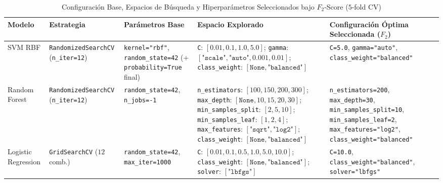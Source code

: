 \documentclass[conference]{IEEEtran}
\begin{document}
\begin{table}[t]
\centering
\scriptsize
\setlength{\tabcolsep}{4pt}
\caption{Configuración Base, Espacios de Búsqueda y Hiperparámetros Seleccionados bajo $F_2$-Score ($5$-fold CV)}
\label{tab:hyperparams_space}
\begin{tabular}{@{}lp{2.85cm}p{2.85cm}p{5.2cm}p{3.75cm}@{}}
\toprule
\textbf{Modelo} & \textbf{Estrategia} & \textbf{Parámetros Base} & \textbf{Espacio Explorado} & \textbf{Configuración Óptima Seleccionada ($F_2$)} \\
\midrule
SVM RBF & \texttt{RandomizedSearchCV} (\texttt{n\_iter=12}) & \texttt{kernel="rbf"}, \texttt{random\_state=42} (+ \texttt{probability=True} final) & \texttt{C}: $[0.01, 0.1, 1.0, 5.0]$; \texttt{gamma}: $[\texttt{"scale"}, \texttt{"auto"}, 0.001, 0.01]$; \texttt{class\_weight}: $[\texttt{None}, \texttt{"balanced"}]$ & \texttt{C=5.0}, \texttt{gamma="auto"}, \texttt{class\_weight="balanced"} \\
\midrule
Random Forest & \texttt{RandomizedSearchCV} (\texttt{n\_iter=12}) & \texttt{random\_state=42}, \texttt{n\_jobs=-1} & \texttt{n\_estimators}: $[100, 150, 200, 300]$; \texttt{max\_depth}: $[\texttt{None}, 10, 15, 20, 30]$; \texttt{min\_samples\_split}: $[2, 5, 10]$; \texttt{min\_samples\_leaf}: $[1, 2, 4]$; \texttt{max\_features}: $[\texttt{"sqrt"}, \texttt{"log2"}]$; \texttt{class\_weight}: $[\texttt{None}, \texttt{"balanced"}]$ & \texttt{n\_estimators=200}, \texttt{max\_depth=30}, \texttt{min\_samples\_split=10}, \texttt{min\_samples\_leaf=2}, \texttt{max\_features="log2"}, \texttt{class\_weight="balanced"} \\
\midrule
Logistic Regression & \texttt{GridSearchCV} ($12$ comb.) & \texttt{random\_state=42}, \texttt{max\_iter=1000} & \texttt{C}: $[0.01, 0.1, 0.5, 1.0, 5.0, 10.0]$; \texttt{class\_weight}: $[\texttt{None}, \texttt{"balanced"}]$; \texttt{solver}: $[\texttt{"lbfgs"}]$ & \texttt{C=10.0}, \texttt{class\_weight="balanced"}, \texttt{solver="lbfgs"} \\
\bottomrule
\end{tabular}
\end{table}
\end{document}
